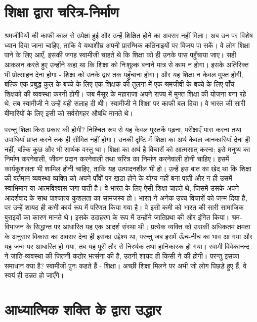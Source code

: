 \section*{शिक्षा द्वारा चरित्र-निर्माण}

श्रमजीवियों की काफी काल से उपेक्षा हुई और उन्हें शिक्षित होने का अवसर नहीं मिला। अब उन पर विशेष ध्यान दिया जाना चाहिए, ताकि वे यथाशीघ्र अपनी प्रारम्भिक कठिनाइयों पर विजय पा सकें। वे लोग शिक्षा पाने के लिए आएँ, इसकी जगह स्वामीजी चाहते थे कि शिक्षा को ही उनके पास पहुँचाया जाए। सही आकलन करते हुए उन्होंने कहा था कि शिक्षा को निःशुल्क बनाने मात्र से काम न होगा। इसके अतिरिक्त भी प्रोत्साहन देना होगा - शिक्षा को उनके द्वार तक पहुँचाना होगा। और यह शिक्षा न केवल मुफ्त होगी, बल्कि एक प्रबुद्ध कुल के बच्चे के लिए एक शिक्षक की तुलना में एक श्रमजीवी के बच्चे के लिए पाँच शिक्षकों की व्यवस्था करनी होगी। जब मैसूर के महाराजा अपने राज्य में मुफ्त शिक्षा की योजना बना रहे थे, तब स्वामीजी ने उन्हें यही सलाह दी थी। स्वामीजी ने शिक्षा पर काफी बल दिया। वे भारत की सारी बीमारियों के लिए इसी को सर्वरोगहर औषधि मानते थे। 

परन्तु शिक्षा किस प्रकार की होगी? निश्चित रूप से यह केवल पुस्तकें पढ़ना, परीक्षाएँ पास करना तथा उपाधियाँ प्राप्त करने तक ही सीमित नहीं होगा। उनकी दृष्टि में शिक्षा का अर्थ केवल जानकारियाँ देना ही नहीं, बल्कि कुछ और भी सार्थक वस्तु था। शिक्षा का अर्थ है विचारों को आत्मसात् करना; इसे मनुष्य का निर्माण करनेवाली, जीवन प्रदान करनेवाली तथा चरित्र का निर्माण करनेवाली होनी चाहिए। इसमें कार्यकुशलता भी शामिल होनी चाहिए, ताकि यह उत्पादनशील भी हो। उन्हें इस बात का खेद था कि शिक्षा की वर्तमान व्यवस्था व्यक्ति को अपने पाँवों पर खड़ा होने के योग्य नहीं बना पाती और न ही उसमें स्वाभिमान या आत्मविश्वास जगा पाती है। वे भारत के लिए ऐसी शिक्षा चाहते थे, जिसमें उसके अपने आदर्शवाद के साथ पाश्चात्य कुशलता का सामंजस्य हो। भारत ने अनेक उच्च विचारों को जन्म दिया है, पर उन्हें शायद ही कभी कार्य रूप में परिणत किया गया है। वे इसी कमी को भारत की सारी सामाजिक बुराइयों का कारण मानते थे। इसके उदाहरण के रूप में उन्होंने जातिप्रथा की ओर इंगित किया। श्रम-विभाजन के सिद्धान्त पर आधारित यह एक आदर्श संस्था थी। प्रत्येक व्यक्ति को उसकी अधिकतम क्षमता के अनुसार विकास का अवसर देना ही इसका उद्देश्य था, परन्तु जब इसमें ऊँच-नीच का भाव आ गया और यह जन्म पर आधारित हो गया, तब यह पूरी तौर से निरर्थक तथा हानिकारक हो गया। स्वामी विवेकानन्द ने जाति-व्यवस्था की जितनी कठोर भर्त्सना की है, उतनी शायद ही किसी ने की होगी। परन्तु इसका समाधान क्या है? स्वामीजी पुनः कहते हैं - शिक्षा। अच्छी शिक्षा मिलने पर अभी जो लोग पिछड़े हुए हैं, वे स्वयं ही उन्नत हो जाएँगे।


\section*{आध्यात्मिक शक्ति के द्वारा उद्धार}

